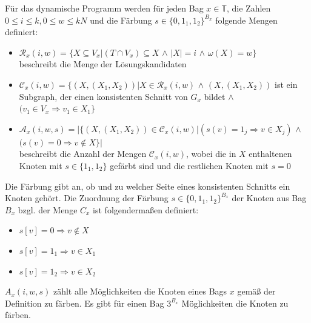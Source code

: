 Für das dynamische Programm werden für jeden Bag $x \in \mathbb{T}$, die Zahlen $0 \leq i \leq k,0 \leq w \leq kN$ und die Färbung $s \in \{0,1_1,1_2 \}^{B_x}$ folgende Mengen definiert:
\begin{itemize}
\item $\mathcal{R}_x(i,w)=\{X \subseteq V_x | (T \cap V_x) \subseteq X$ $\wedge$ $|X| = i$ $\wedge$ $\omega (X) = w \}$ \\
beschreibt die Menge der Lösungskandidaten
\item $\mathcal{C}_x (i,w) =\{ (X,(X_1,X_2)) | X \in \mathcal{R}_x(i,w)$ $\wedge$ $(X,(X_1,X_2))$ ist ein Subgraph, der einen konsistenten Schnitt von $G_x$ bildet $\wedge$ $(v_1 \in V_x \Rightarrow v_1 \in X_1 \} $
\item $\mathcal{A}_x(i,w,s)=| \{ (X,(X_1,X_2)) \in \mathcal{C}_x(i,w) | (s(v) = 1_j \Rightarrow v \in X_j)$ $\wedge$ $(s(v)=0 \Rightarrow v \notin X \} |$ \\
beschreibt die Anzahl der Mengen $\mathcal{C}_x(i,w)$, wobei die in $X$ enthaltenen Knoten mit $s \in \{1_1,1_2\}$ gefärbt sind und die restlichen Knoten mit $s=0$ 
\end{itemize}
Die Färbung gibt an, ob und zu welcher Seite eines konsistenten Schnitts ein Knoten gehört.
Die Zuordnung der Färbung $s \in \{0,1_1,1_2 \}^{B_x}$  der Knoten aus Bag $B_x$ bzgl. der Menge $C_x$ ist folgendermaßen definiert:
\begin{itemize}
\item $s[v] = 0 \Rightarrow v \notin X$
\item $s[v] = 1_1 \Rightarrow v \in X_1$ 
\item $s[v] = 1_2 \Rightarrow v \in X_2$ 
\end{itemize}
$A_x(i,w,s)$ zählt alle Möglichkeiten die Knoten eines Bags $x$ gemäß der Definition zu färben. Es gibt für einen Bag $3^{B_x}$ Möglichkeiten die Knoten zu färben.

